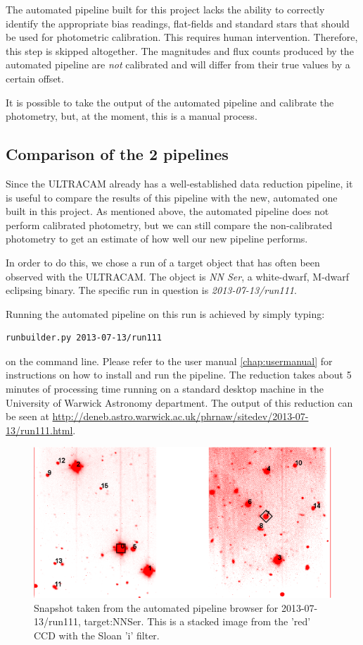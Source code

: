 The automated pipeline built for this project lacks the ability to correctly identify the appropriate bias readings, flat-fields and standard stars that should be used for photometric calibration. This requires human intervention. Therefore, this step is skipped altogether. The magnitudes and flux counts produced by the automated pipeline are \emph{not} calibrated and will differ from their true values by a certain offset.

It is possible to take the output of the automated pipeline and calibrate the photometry, but, at the moment, this is a manual process. 

\subsection{Comparison of the 2 pipelines}
Since the ULTRACAM already has a well-established data reduction pipeline, it is useful to compare the results of this pipeline with the new, automated one built in this project. As mentioned above, the automated pipeline does not perform calibrated photometry, but we can still compare the non-calibrated photometry to get an estimate of how well our new pipeline performs.

In order to do this, we chose a run of a target object that has often been observed with the ULTRACAM. The object is \emph{NN Ser}, a white-dwarf, M-dwarf eclipsing binary. The specific run in question is \emph{2013-07-13/run111}.

Running the automated pipeline on this run is achieved by simply typing: \begin{verbatim}runbuilder.py 2013-07-13/run111 \end{verbatim} on the command line. Please refer to the user manual \ref{chap:usermanual} for instructions on how to install and run the pipeline.  The reduction takes about 5 minutes of processing time running on a standard desktop machine in the University of Warwick Astronomy department. The output of this reduction can be seen at \url{http://deneb.astro.warwick.ac.uk/phrnaw/sitedev/2013-07-13/run111.html}.

\begin{figure}[!h]
\centering
\includegraphics[width=120mm]{images/2013-07-13-run111-r-withlabels.png}
\caption{Snapshot taken from the automated pipeline browser for 2013-07-13/run111, target:NNSer. This is a stacked image from the 'red' CCD with the Sloan 'i' filter. }
\label{fig:nnserfield}
\end{figure}


